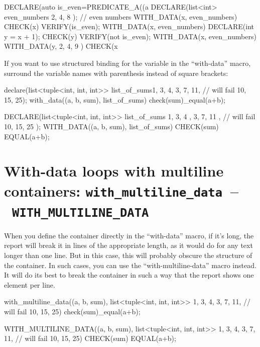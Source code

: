 \documentclass[twoside, a4paper, article]{memoir}
\newcommand*\testudocolor{\color{red!80!blue}}
\newcommand*\testudo[1]{\texttt{\testudocolor{}#1}}
\newcommand*\testudopair[2]{\testudo{#1}~--~\testudo{#2}}
\newcommand\sectiontestudopair[3]{%
  \section[#1]{#1: \testudopair{#2}{#3}}}
\begin{document}
\begin{cpplisting}
DECLARE(auto is_even=PREDICATE_A((a %
DECLARE(list<int> even_numbers{ 2, 4, 8 }); // even numbers
WITH_DATA(x, even_numbers)
  CHECK(x) VERIFY(is_even);
WITH_DATA(x, even_numbers)
{
  DECLARE(int y = x + 1);
  CHECK(y) VERIFY(not is_even);
}
WITH_DATA(x, even_numbers)
  WITH_DATA(y, { 2, 4, 9 })
    CHECK(x %
\end{cpplisting}

If you want to use structured binding for the variable in the ``with-data''
macro, surround the variable names with parenthesis instead of square brackets:
\begin{cpplisting}
declare(list<tuple<int, int, int>>
          list_of_sums{{1, 3, 4},
                       {3, 7, 11}, // will fail
                       {10, 15, 25}});
with_data((a, b, sum), list_of_sums)
  check(sum)_equal(a+b);
\end{cpplisting}

\begin{cpplisting}
DECLARE(list<tuple<int, int, int>>
          list_of_sums{ { 1, 3, 4 },
                        { 3, 7, 11 }, // will fail
                        { 10, 15, 25 } });
WITH_DATA((a, b, sum), list_of_sums)
  CHECK(sum) EQUAL(a+b);
\end{cpplisting}

\sectiontestudopair{With-data loops with multiline containers}%
  {with\_multiline\_data}{WITH\_MULTILINE\_DATA}

When you define the container directly in the ``with-data'' macro, if it's
long, the report will break it in lines of the appropriate length, as it would
do for any text longer than one line.  But in this case, this will probably
obscure the structure of the container.  In such cases, you can use the
``with-multiline-data'' macro instead.  It will do its best to break the
container in such a way that the report shows one element per line.

\begin{cpplisting}
with_multiline_data((a, b, sum), list<tuple<int, int, int>>{
    {1, 3, 4},
    {3, 7, 11}, // will fail
    {10, 15, 25}})
  check(sum)_equal(a+b);
\end{cpplisting}

\begin{cpplisting}
WITH_MULTILINE_DATA((a, b, sum), list<tuple<int, int, int>>{
    {1, 3, 4},
    {3, 7, 11}, // will fail
    {10, 15, 25}})
  CHECK(sum) EQUAL(a+b);
\end{cpplisting}
\end{document}
